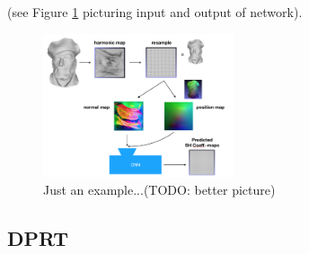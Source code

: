 (see Figure \ref{Fig: Method_Overview} picturing input and output of network). 
\begin{figure}[H]
  \centering
    \includegraphics[width=0.5\textwidth]{Figures/Overview_method}
     \caption{Just an example...(TODO: better picture)}
     \label{Fig: Method_Overview}
\end{figure}
\subsection{DPRT}



